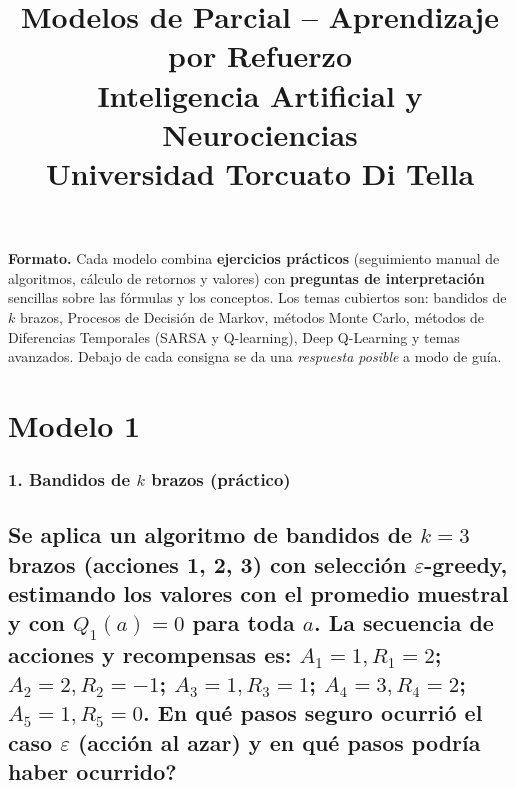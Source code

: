 \documentclass[11pt, a4paper]{article}
\title{\textbf{Modelos de Parcial -- Aprendizaje por Refuerzo} \\
\large Inteligencia Artificial y Neurociencias \\ Universidad Torcuato Di Tella}
\author{}
\date{}
\newcommand{\pregunta}[1]{\subsection{#1}}
\newcommand{\eje}[1]{\subsubsection{#1}}
\begin{document}
\maketitle

\begin{mdframed}[linecolor=black, linewidth=0.7pt]
\textbf{Formato.} Cada modelo combina \textbf{ejercicios pr\'acticos} (seguimiento manual de algoritmos, c\'alculo de retornos y valores) con \textbf{preguntas de interpretaci\'on} sencillas sobre las f\'ormulas y los conceptos. Los temas cubiertos son: bandidos de $k$ brazos, Procesos de Decisi\'on de Markov, m\'etodos Monte Carlo, m\'etodos de Diferencias Temporales (SARSA y Q-learning), Deep Q-Learning y temas avanzados. Debajo de cada consigna se da una \emph{respuesta posible} a modo de gu\'ia.
\end{mdframed}

\section{Modelo 1}

\eje{1. Bandidos de $k$ brazos (pr\'actico)}
\pregunta{Se aplica un algoritmo de bandidos de $k=3$ brazos (acciones 1, 2, 3) con selecci\'on $\varepsilon$-greedy, estimando los valores con el promedio muestral y con $Q_1(a)=0$ para toda $a$. La secuencia de acciones y recompensas es: $A_1{=}1, R_1{=}2$; $A_2{=}2, R_2{=}{-}1$; $A_3{=}1, R_3{=}1$; $A_4{=}3, R_4{=}2$; $A_5{=}1, R_5{=}0$. \textquestiondown En qu\'e pasos \textbf{seguro} ocurri\'o el caso $\varepsilon$ (acci\'on al azar) y en qu\'e pasos \textbf{podr\'ia} haber ocurrido?}
\end{document}
